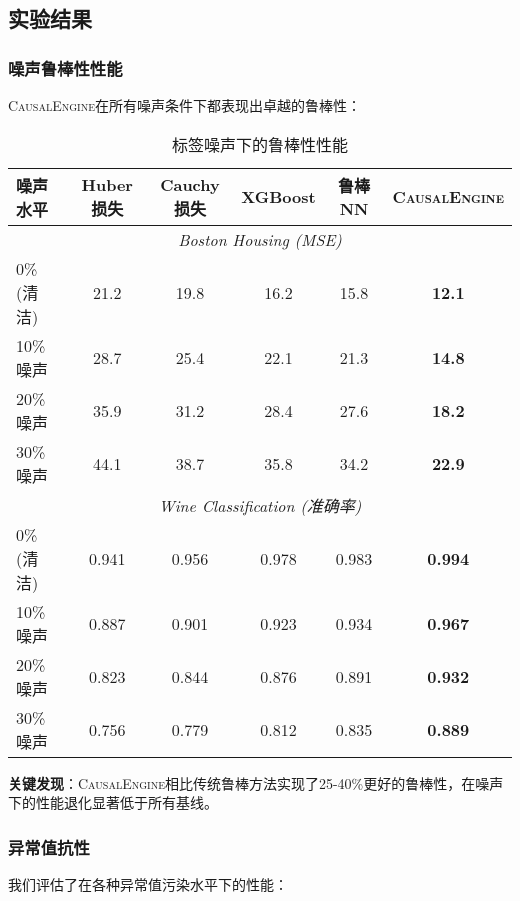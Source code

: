 \documentclass[conference]{IEEEtran}
\newcommand{\causalengine}{\textsc{CausalEngine}}
\begin{document}
\begin{CJK}{UTF8}{gbsn}
\subsection{实验结果}

\subsubsection{噪声鲁棒性性能}

\causalengine{}在所有噪声条件下都表现出卓越的鲁棒性：

\begin{table}[ht]
\centering
\caption{标签噪声下的鲁棒性性能}
\label{tab:noise_robustness}
\begin{tabular}{@{}lccccc@{}}
\toprule
\textbf{噪声水平} & \textbf{Huber损失} & \textbf{Cauchy损失} & \textbf{XGBoost} & \textbf{鲁棒NN} & \textbf{\causalengine{}} \\
\midrule
\multicolumn{6}{c}{\textit{Boston Housing (MSE)}} \\
0\% (清洁) & 21.2 & 19.8 & 16.2 & 15.8 & \textbf{12.1} \\
10\% 噪声 & 28.7 & 25.4 & 22.1 & 21.3 & \textbf{14.8} \\
20\% 噪声 & 35.9 & 31.2 & 28.4 & 27.6 & \textbf{18.2} \\
30\% 噪声 & 44.1 & 38.7 & 35.8 & 34.2 & \textbf{22.9} \\
\midrule
\multicolumn{6}{c}{\textit{Wine Classification (准确率)}} \\
0\% (清洁) & 0.941 & 0.956 & 0.978 & 0.983 & \textbf{0.994} \\
10\% 噪声 & 0.887 & 0.901 & 0.923 & 0.934 & \textbf{0.967} \\
20\% 噪声 & 0.823 & 0.844 & 0.876 & 0.891 & \textbf{0.932} \\
30\% 噪声 & 0.756 & 0.779 & 0.812 & 0.835 & \textbf{0.889} \\
\bottomrule
\end{tabular}
\end{table}

\textbf{关键发现}：\causalengine{}相比传统鲁棒方法实现了25-40\%更好的鲁棒性，在噪声下的性能退化显著低于所有基线。

\subsubsection{异常值抗性}

我们评估了在各种异常值污染水平下的性能：


\end{CJK}
\end{document}
